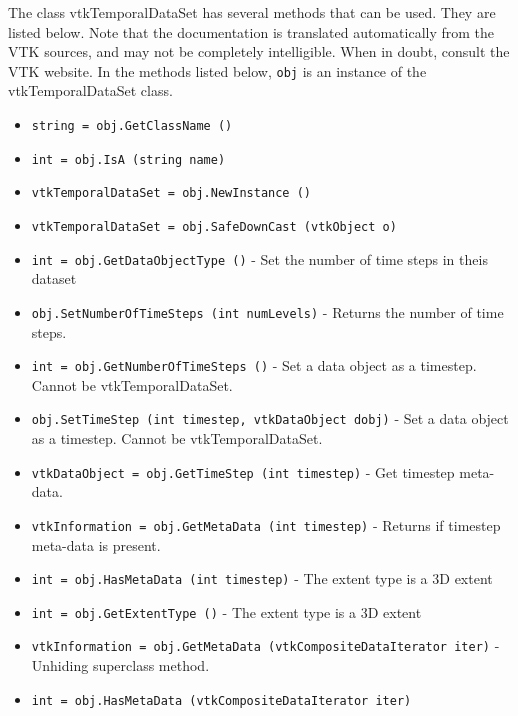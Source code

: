 The class vtkTemporalDataSet has several methods that can be used.
  They are listed below.
Note that the documentation is translated automatically from the VTK sources,
and may not be completely intelligible.  When in doubt, consult the VTK website.
In the methods listed below, \verb|obj| is an instance of the vtkTemporalDataSet class.
\begin{itemize}
\item  \verb|string = obj.GetClassName ()|

\item  \verb|int = obj.IsA (string name)|

\item  \verb|vtkTemporalDataSet = obj.NewInstance ()|

\item  \verb|vtkTemporalDataSet = obj.SafeDownCast (vtkObject o)|

\item  \verb|int = obj.GetDataObjectType ()| -  Set the number of time steps in theis dataset

\item  \verb|obj.SetNumberOfTimeSteps (int numLevels)| -  Returns the number of time steps.

\item  \verb|int = obj.GetNumberOfTimeSteps ()| -  Set a data object as a timestep. Cannot be vtkTemporalDataSet.

\item  \verb|obj.SetTimeStep (int timestep, vtkDataObject dobj)| -  Set a data object as a timestep. Cannot be vtkTemporalDataSet.

\item  \verb|vtkDataObject = obj.GetTimeStep (int timestep)| -  Get timestep meta-data.

\item  \verb|vtkInformation = obj.GetMetaData (int timestep)| -  Returns if timestep meta-data is present.

\item  \verb|int = obj.HasMetaData (int timestep)| -  The extent type is a 3D extent

\item  \verb|int = obj.GetExtentType ()| -  The extent type is a 3D extent

\item  \verb|vtkInformation = obj.GetMetaData (vtkCompositeDataIterator iter)| -  Unhiding superclass method.

\item  \verb|int = obj.HasMetaData (vtkCompositeDataIterator iter)|

\end{itemize}
